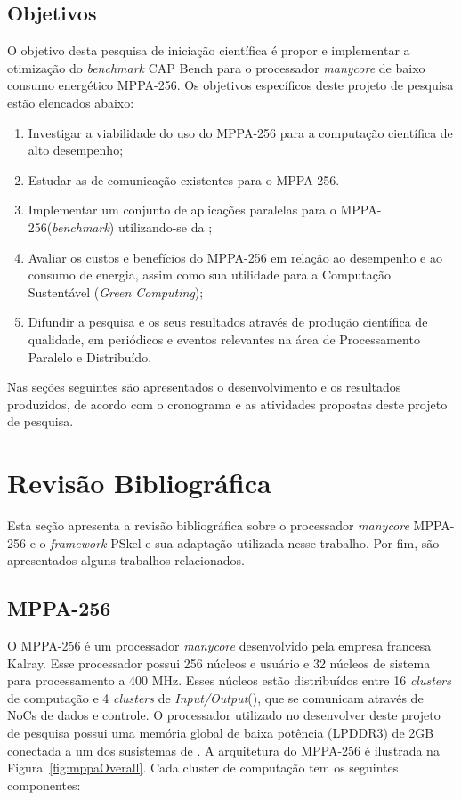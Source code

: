 \documentclass[a4paper,11pt]{article}
\newcommand{\mppa}{MPPA-256\xspace}
\newcommand{\capb}{CAP Bench\xspace}
\newcommand{\manycore}{\textit{manycore}\xspace}
\newcommand{\bench}{\textit{benchmark}\xspace}
\begin{document}
\subsection{Objetivos}

O objetivo desta pesquisa de iniciação científica é propor e implementar a otimização do \bench \capb para o processador \manycore de baixo consumo energético \mppa. Os objetivos específicos deste projeto de pesquisa estão elencados abaixo:

\begin{enumerate}
	\setlength\itemsep{0em}
	\item Investigar a viabilidade do uso do \mppa para a computação científica de alto desempenho;
	\item Estudar as \apis de comunicação existentes para o \mppa.
	\item Implementar um conjunto de aplicações paralelas para o \mppa (\bench) utilizando-se da \api \async;
	\item Avaliar os custos e benefícios do \mppa em relação ao desempenho e ao consumo de energia, assim como sua utilidade para a Computação Sustentável (\textit{Green Computing});
	\item Difundir a pesquisa e os seus resultados através de produção científica de qualidade, em periódicos e eventos relevantes na área de Processamento Paralelo e Distribuído.
\end{enumerate}

Nas seções seguintes são apresentados o desenvolvimento e os resultados produzidos, de acordo com o cronograma e as atividades propostas deste projeto de pesquisa.

\section{Revisão Bibliográfica}

Esta seção apresenta a revisão bibliográfica sobre o processador \textit{manycore} \mppa e o \textit{framework} PSkel e sua adaptação utilizada nesse trabalho. Por fim, são apresentados alguns trabalhos relacionados.

\subsection{MPPA-256}
\label{subsec:mppa}

O \mppa é um processador \textit{manycore} desenvolvido pela empresa francesa
Kalray. Esse processador possui 256 núcleos e usuário e 32 núcleos de sistema para processamento a 400 MHz. Esses núcleos estão distribuídos entre 16 \emph{clusters} de computação e 4 \emph{clusters} de \emph{Input/Output}(\io), que se comunicam através de NoCs de dados e controle. O processador utilizado no desenvolver deste projeto de pesquisa possui uma memória global de baixa potência (LPDDR3) de 2GB conectada a um dos susistemas de \io. A arquitetura do \mppa é ilustrada na Figura~\ref{fig:mppaOverall}. Cada cluster de computação tem os seguintes componentes:
\end{document}
